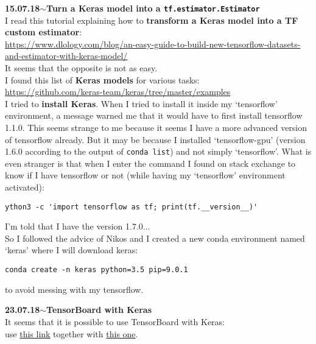 \documentclass[11pt,a4paper]{article}
\newenvironment{loggentry}[2]%
{\noindent\textbf{#1}\hspace{1cm}$\mathbf{\sim}$\text{ }\textbf{#2}\\}{\vspace{0.5cm}}
\begin{document}
\begin{loggentry}{15.07.18}{Turn a Keras model into a \texttt{tf.estimator.Estimator}}
I read this tutorial explaining how to \textbf{transform a Keras model into a TF custom estimator}:\\
\url{https://www.dlology.com/blog/an-easy-guide-to-build-new-tensorflow-datasets-and-estimator-with-keras-model/}\\
It seems that the opposite is not as easy.\\

I found this list of \textbf{Keras models} for various tasks:\\
\url{https://github.com/keras-team/keras/tree/master/examples}\\

I tried to \textbf{install Keras}. When I tried to install it inside my `tensorflow' environment, a message warned me that it would have to first install tensorflow 1.1.0. This seems strange to me because it seems I have a more advanced version of tensorflow already. But it may be because I installed `tensorflow-gpu' (version 1.6.0 according to the output of \texttt{conda list}) and not simply `tensorflow'. What is even stranger is that when I enter the command I found on stack exchange to know if I have tensorflow or not (while having my `tensorflow' environment activated):
\begin{verbatim}
ython3 -c 'import tensorflow as tf; print(tf.__version__)' 
\end{verbatim}
I'm told that I have the version 1.7.0...\\
So I followed the advice of Nikos and I created a new conda environment named `keras' where I will download keras:\\
\begin{verbatim}
conda create -n keras python=3.5 pip=9.0.1 
\end{verbatim}
to avoid messing with my tensorflow.
\end{loggentry}

\begin{loggentry}{23.07.18}{TensorBoard with Keras}
It seems that it is possible to use TensorBoard with Keras:\\
use \href{https://keras.io/callbacks/#tensorboard}{this link} together with \href{https://stackoverflow.com/questions/42112260/how-do-i-use-the-tensorboard-callback-of-keras#42112935}{this one}.\\

\end{loggentry}
\end{document}

